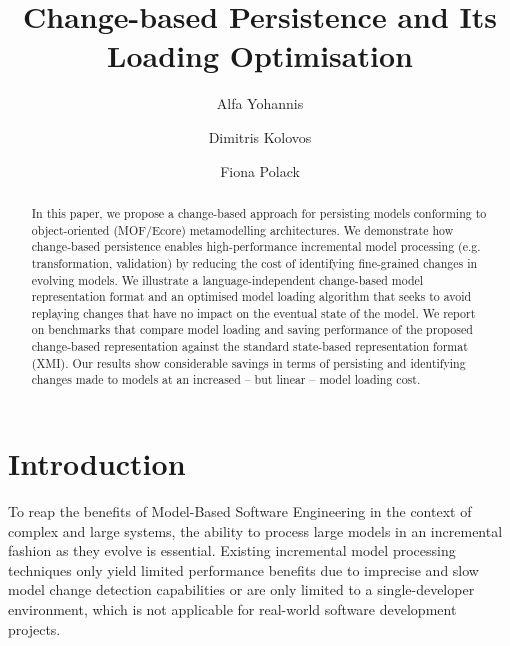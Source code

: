 \documentclass{llncs}
\begin{document}
\renewcommand{\thelstlisting}{\arabic{lstlisting}}
\renewcommand{\labelitemi}{$\bullet$}
\newcommand{\dk}[1]{\textbf{[DK: #1]}}

\title{Change-based Persistence and Its Loading Optimisation}
%
%
\author{Alfa Yohannis \and Dimitris Kolovos \and Fiona Polack }
%
%
%

\maketitle              %

\begin{abstract}
In this paper, we propose a change-based approach for persisting models conforming to object-oriented (MOF/Ecore) metamodelling architectures. We demonstrate how change-based persistence enables high-performance incremental model processing (e.g. transformation, validation) by reducing the cost of identifying fine-grained changes in evolving models. We illustrate a language-independent change-based model representation format and an optimised model loading algorithm that seeks to avoid replaying changes that have no impact on the eventual state of the model. We report on benchmarks that compare model loading and saving performance of the proposed change-based representation against the standard state-based representation format (XMI). Our results show considerable savings in terms of persisting and identifying changes made to models at an increased -- but linear -- model loading cost.
\end{abstract}

\section{Introduction}
\label{sec:introduction}
To reap the benefits of Model-Based Software Engineering in the context of complex and large systems, the ability to process large models in an incremental fashion as they evolve is essential. Existing incremental model processing techniques only yield limited performance benefits due to imprecise and slow model change detection capabilities or are only limited to a single-developer environment, which is not applicable for real-world software development projects.
\end{document}
